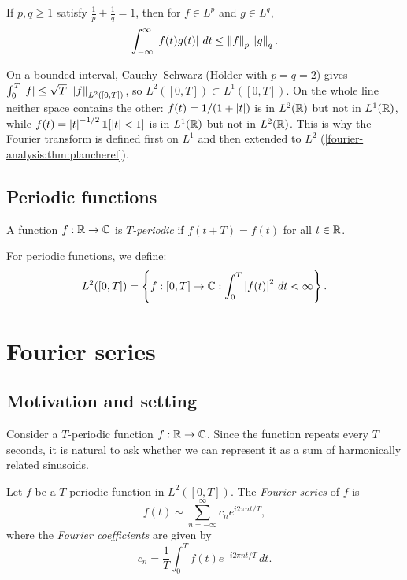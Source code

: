 \begin{notechapter}
\begin{theorem}
If $p, q \geq 1$ satisfy $\frac{1}{p} + \frac{1}{q} = 1$, then for $f \in L^p$ and $g \in L^q$,
\[
\int_{-\infty}^{\infty} \left|f(t)g(t)\right| \, dt \leq \left\|f\right\|_p \left\|g\right\|_q.
\]
\end{theorem}

\begin{pitfall}[$L^1$ versus $L^2$]
On a bounded interval, Cauchy--Schwarz (Hölder with $p=q=2$) gives $\int_0^T \left|f\right| \le \sqrt{T}\,\left\|f\right\|_{L^2([0,T])}$, so $L^2([0,T]) \subset L^1([0,T])$. On the whole line neither space contains the other: $f(t) = 1/(1+\left|t\right|)$ is in $L^2(\mathbb{R})$ but not in $L^1(\mathbb{R})$, while $f(t) = \left|t\right|^{-1/2}\mathbf{1}[\left|t\right|<1]$ is in $L^1(\mathbb{R})$ but not in $L^2(\mathbb{R})$. This is why the Fourier transform is defined first on $L^1$ and then extended to $L^2$ (\cref{fourier-analysis:thm:plancherel}).
\end{pitfall}

\subsection{Periodic functions}

\begin{definition}
A function $f:\mathbb{R} \to \mathbb{C}$ is \emph{$T$-periodic} if $f(t+T) = f(t)$ for all $t \in \mathbb{R}$.
\end{definition}

For periodic functions, we define:
\[
L^2([0,T]) = \left\{ f:[0,T] \to \mathbb{C} : \int_0^T \left|f(t)\right|^2 \, dt < \infty \right\}.
\]

\section{Fourier series}

\subsection{Motivation and setting}

Consider a $T$-periodic function $f:\mathbb{R} \to \mathbb{C}$. Since the function repeats every $T$ seconds, it is natural to ask whether we can represent it as a sum of harmonically related sinusoids.

\begin{definition}
Let $f$ be a $T$-periodic function in $L^2([0,T])$. The \emph{Fourier series} of $f$ is
\[
f(t) \sim \sum_{n=-\infty}^{\infty} c_n e^{i 2\pi n t/T},
\]
where the \emph{Fourier coefficients} are given by
\[
c_n = \frac{1}{T} \int_0^T f(t) e^{-i 2\pi n t/T} \, dt.
\]
\end{definition}


\end{notechapter}
